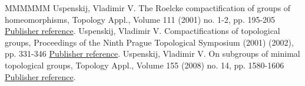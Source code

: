 \begin{thebibliography}{MMMMMM}
 Uspenskij, Vladimir V. The Roelcke compactification of groups of homeomorphisms, Topology Appl., Volume 111 (2001) no. 1-2, pp. 195-205 \href{https://ahl.centre-mersenne.org/item/AHL_2019__2__149_0/#Us3}{Publisher reference}.
 Uspenskij, Vladimir V. Compactifications of topological groups, Proceedings of the Ninth Prague Topological Symposium (2001) (2002), pp. 331-346 \href{https://ahl.centre-mersenne.org/item/AHL_2019__2__149_0/#Us4}{Publisher reference}.
 Uspenskij, Vladimir V. On subgroups of minimal topological groups, Topology Appl., Volume 155 (2008) no. 14, pp. 1580-1606 \href{https://ahl.centre-mersenne.org/item/AHL_2019__2__149_0/#Us5}{Publisher reference}.
\end{thebibliography}
